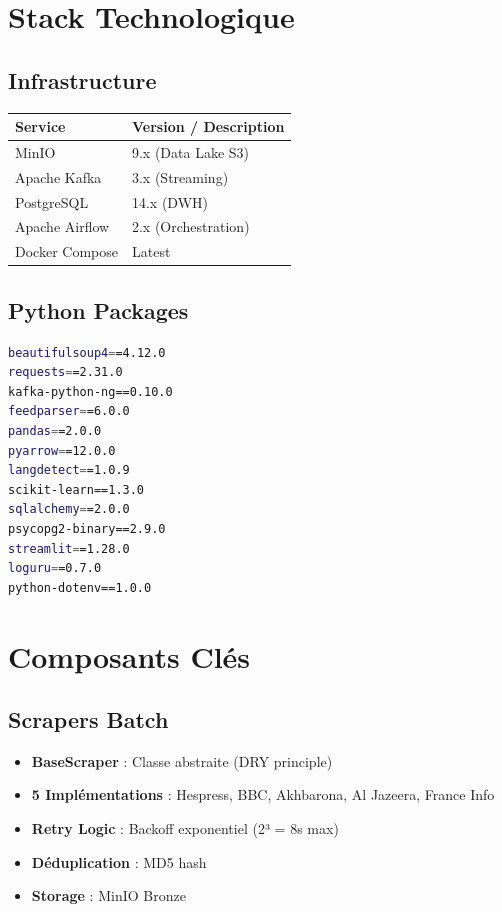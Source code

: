 \documentclass[12pt,a4paper]{report}
\begin{document}
\section{Stack Technologique}

\subsection{Infrastructure}

\begin{table}[H]
    \centering
    \begin{tabular}{ll}
        \toprule
        \textbf{Service} & \textbf{Version / Description} \\
        \midrule
        MinIO            & 9.x (Data Lake S3)             \\
        Apache Kafka     & 3.x (Streaming)                \\
        PostgreSQL       & 14.x (DWH)                     \\
        Apache Airflow   & 2.x (Orchestration)            \\
        Docker Compose   & Latest                         \\
        \bottomrule
    \end{tabular}
\end{table}

\subsection{Python Packages}

\begin{lstlisting}[language=bash, caption={Dépendances Python principales}]
beautifulsoup4==4.12.0
requests==2.31.0
kafka-python-ng==0.10.0
feedparser==6.0.0
pandas==2.0.0
pyarrow==12.0.0
langdetect==1.0.9
scikit-learn==1.3.0
sqlalchemy==2.0.0
psycopg2-binary==2.9.0
streamlit==1.28.0
loguru==0.7.0
python-dotenv==1.0.0
\end{lstlisting}

\section{Composants Clés}

\subsection{Scrapers Batch}

\begin{itemize}
    \item \textbf{BaseScraper} : Classe abstraite (DRY principle)
    \item \textbf{5 Implémentations} : Hespress, BBC, Akhbarona, Al Jazeera, France Info
    \item \textbf{Retry Logic} : Backoff exponentiel (2³ = 8s max)
    \item \textbf{Déduplication} : MD5 hash
    \item \textbf{Storage} : MinIO Bronze
\end{itemize}
\end{document}
